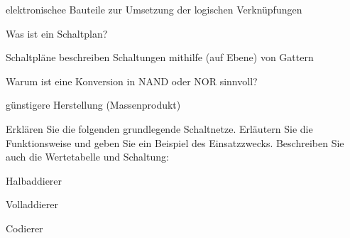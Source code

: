 \documentclass
[
  draft    = true,
  fontsize = 11pt,
  parskip  = half-,
  BCOR     = 0pt,
  DIV      = 11,
  ngerman,
  dvipsnames
]
{scrartcl}
\begin{document}
\begin{mytemize}
\begin{achim}
          \begin{mytemize}
            \item elektronischee Bauteile zur Umsetzung der logischen Verknüpfungen
          \end{mytemize}
        \end{achim}
  \item Was ist ein Schaltplan?
        \begin{achim}
          \begin{mytemize}
            \item Schaltpläne beschreiben Schaltungen mithilfe (auf Ebene) von Gattern
          \end{mytemize}
        \end{achim}
  \item Warum ist eine Konversion in NAND oder NOR sinnvoll?
        \begin{achim}
          \begin{mytemize}
            \item günstigere Herstellung (Massenprodukt)
          \end{mytemize}
        \end{achim}
  \item Erklären Sie die folgenden grundlegende Schaltnetze. Erläutern
        Sie die Funktionsweise und geben Sie ein Beispiel des Einsatzzwecks.
        Beschreiben Sie auch die Wertetabelle und Schaltung:
        \begin{mytemize}
          \item Halbaddierer
                \begin{achim}
                  \begin{mytemize}
                    \item 
                  \end{mytemize}
                \end{achim}
          \item Volladdierer
                \begin{achim}
                  \begin{mytemize}
                    \item 
                  \end{mytemize}
                \end{achim}
          \item Codierer
                \begin{achim}
                  \begin{mytemize}
                    \item 

\end{mytemize}
\end{achim}
\end{mytemize}
\end{mytemize}
\end{document}
